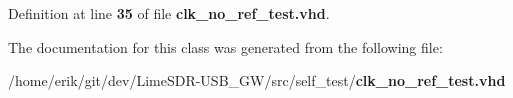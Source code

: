 Definition at line {\bf 35} of file {\bf clk\+\_\+no\+\_\+ref\+\_\+test.\+vhd}.



The documentation for this class was generated from the following file\+:\begin{DoxyCompactItemize}
\item 
/home/erik/git/dev/\+Lime\+S\+D\+R-\/\+U\+S\+B\+\_\+\+G\+W/src/self\+\_\+test/{\bf clk\+\_\+no\+\_\+ref\+\_\+test.\+vhd}\end{DoxyCompactItemize}
